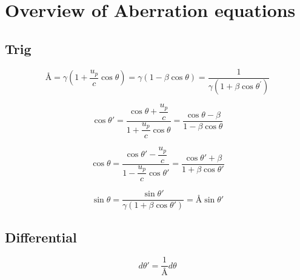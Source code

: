\appendix
\chapter{Overview of Aberration equations}


\section{Trig}
\begin{equation}%
    \text{\AA} = \gamma\left(1+\dfrac{u_p}{c}\cos\theta\right) = \gamma\left(1-\beta\cos\theta\right) = \frac{1}{\gamma\left(1+\beta\cos\theta^{'}\right)}
\end{equation}%

\begin{equation}%
\label{A Cosine transform}
    \cos\theta' = \dfrac{\cos\theta + \dfrac{u_p}{c}}{1+\dfrac{u_p}{c}\cos\theta} = \dfrac{\cos\theta - \beta}{1-\beta\cos\theta}
\end{equation}%

\begin{equation}%
\label{Reverse Cosine transform}
    \cos\theta = \dfrac{\cos\theta' - \dfrac{u_p}{c}}{1-\dfrac{u_p}{c}\cos\theta'} = \dfrac{\cos\theta' + \beta}{1+\beta\cos\theta'}
\end{equation}%

\begin{equation}%
\label{Sine transform}
    \sin\theta = \dfrac{\sin\theta'}{\gamma \left(1+\beta\cos\theta'\right)} = \text{\AA}\sin\theta'
\end{equation}%

\section{Differential}

\begin{equation}%
\label{Differential transform}
    d\theta' = \dfrac{1}{\text{\AA}} d\theta
\end{equation}%

